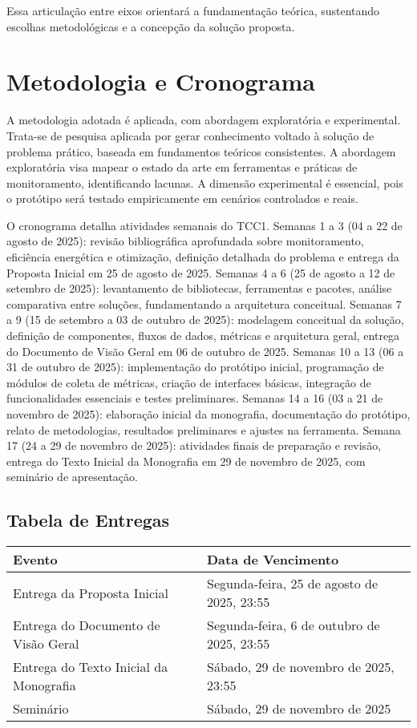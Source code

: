\documentclass[12pt,a4paper]{article}
\begin{document}
Essa articulação entre eixos orientará a fundamentação teórica, sustentando escolhas metodológicas e a concepção da solução proposta.

\section{Metodologia e Cronograma}
A metodologia adotada é aplicada, com abordagem exploratória e experimental. Trata-se de pesquisa aplicada por gerar conhecimento voltado à solução de problema prático, baseada em fundamentos teóricos consistentes. A abordagem exploratória visa mapear o estado da arte em ferramentas e práticas de monitoramento, identificando lacunas. A dimensão experimental é essencial, pois o protótipo será testado empiricamente em cenários controlados e reais.

O cronograma detalha atividades semanais do TCC1. Semanas 1 a 3 (04 a 22 de agosto de 2025): revisão bibliográfica aprofundada sobre monitoramento, eficiência energética e otimização, definição detalhada do problema e entrega da Proposta Inicial em 25 de agosto de 2025. Semanas 4 a 6 (25 de agosto a 12 de setembro de 2025): levantamento de bibliotecas, ferramentas e pacotes, análise comparativa entre soluções, fundamentando a arquitetura conceitual. Semanas 7 a 9 (15 de setembro a 03 de outubro de 2025): modelagem conceitual da solução, definição de componentes, fluxos de dados, métricas e arquitetura geral, entrega do Documento de Visão Geral em 06 de outubro de 2025. Semanas 10 a 13 (06 a 31 de outubro de 2025): implementação do protótipo inicial, programação de módulos de coleta de métricas, criação de interfaces básicas, integração de funcionalidades essenciais e testes preliminares. Semanas 14 a 16 (03 a 21 de novembro de 2025): elaboração inicial da monografia, documentação do protótipo, relato de metodologias, resultados preliminares e ajustes na ferramenta. Semana 17 (24 a 29 de novembro de 2025): atividades finais de preparação e revisão, entrega do Texto Inicial da Monografia em 29 de novembro de 2025, com seminário de apresentação.

\subsection*{Tabela de Entregas}
\begin{center}
\begin{tabular}{|p{7cm}|p{5cm}|}
\hline
\textbf{Evento} & \textbf{Data de Vencimento} \\ \hline
Entrega da Proposta Inicial & Segunda-feira, 25 de agosto de 2025, 23:55 \\ \hline
Entrega do Documento de Visão Geral & Segunda-feira, 6 de outubro de 2025, 23:55 \\ \hline
Entrega do Texto Inicial da Monografia & Sábado, 29 de novembro de 2025, 23:55 \\ \hline
Seminário & Sábado, 29 de novembro de 2025 \\ \hline
\end{tabular}
\end{center}
\end{document}
